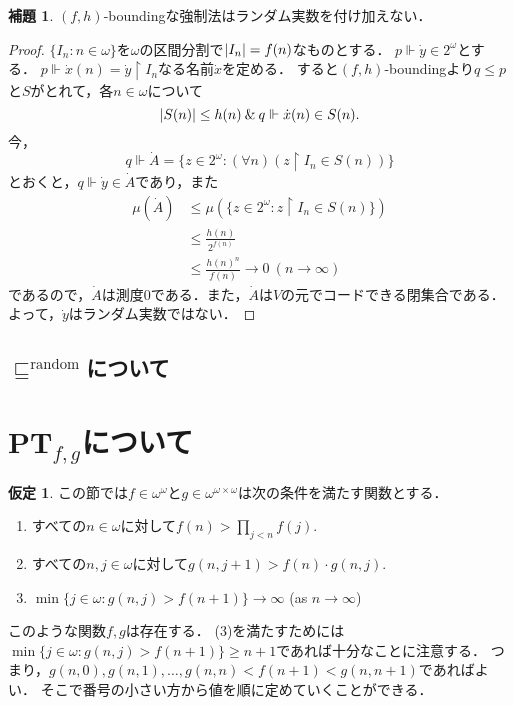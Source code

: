 \documentclass[uplatex]{jsarticle}
\newcommand\forces{\Vdash}
\newcommand{\PTfg}{\mathbf{PT}_{f,g}}
\newcommand{\AND}{\mathbin{\&}}
\DeclarePairedDelimiter\abs{\lvert}{\rvert}
\theoremstyle{definition}
\newtheorem{lem}[thm]{補題}
\newtheorem{asm}[thm]{仮定}
\begin{document}
	\begin{lem}
	$(f, h)$-boundingな強制法はランダム実数を付け加えない．
	\end{lem}
	\begin{proof}
		$\{ I_n : n \in \omega\}$を$\omega$の区間分割で$\abs{I_n} = f(n)$なものとする．
		$p \forces \dot{y} \in 2^\omega$とする．
		$p \forces \dot{x}(n) = \dot{y} \upharpoonright I_n$なる名前$\dot{x}$を定める．
		すると$(f, h)$-boundingより$q \le p$と$S$がとれて，各$n \in \omega$について
		\[
		\abs{S(n)} \le h(n) \AND q \forces \dot{x}(n) \in S(n).
		\]
		今，
		\[
		q \forces \dot{A} = \{ z \in 2^\omega : (\forall n)(z \upharpoonright I_n \in S(n)) \}	
		\]
		とおくと，$q \forces \dot{y} \in \dot{A}$であり，また
		\begin{align*}
		\mu(\dot{A}) &\le \mu(\{ z \in 2^\omega : z \upharpoonright I_n \in S(n) \}) \\
		&\le \frac{h(n)}{2^{f(n)}} \\
		&\le \frac{h(n)^n}{f(n)} \to 0\ (n \to \infty) 
		\end{align*}
		であるので，$\dot{A}$は測度$0$である．また，$\dot{A}$は$V$の元でコードできる閉集合である．
		よって，$\dot{y}$はランダム実数ではない．
	\end{proof}
	
	\subsection{$\sqsubseteq^{\mathrm{random}}$について}
	
	\section{$\PTfg$について}
		
	\begin{asm}\label{fgassumption}
		この節では$f \in \omega^\omega$と$g \in \omega^{\omega \times \omega}$は次の条件を満たす関数とする．
		\begin{enumerate}
			\item すべての$n \in \omega$に対して$f(n) > \prod_{j < n} f(j)$.
			\item すべての$n, j \in \omega$に対して$g(n, j+1) > f(n) \cdot g(n, j)$.
			\item $\min \{ j \in \omega : g(n, j) > f(n+1) \} \to \infty$ (as $n \to \infty$)
		\end{enumerate}
	\end{asm}

	このような関数$f, g$は存在する．
	(3)を満たすためには$\min \{ j \in \omega : g(n, j) > f(n+1) \} \ge n+1$であれば十分なことに注意する．
	つまり，$g(n, 0), g(n, 1), \dots, g(n, n) < f(n+1) < g(n, n+1)$であればよい．
	そこで番号の小さい方から値を順に定めていくことができる．
	
\end{document}
